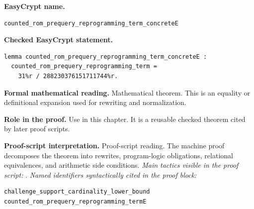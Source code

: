 \begin{formaltheorem}
\noindent\textbf{EasyCrypt name.}
\begin{lstlisting}[language=EasyCrypt,basicstyle=\ttfamily\scriptsize]
counted_rom_prequery_reprogramming_term_concreteE
\end{lstlisting}
\noindent\textbf{Checked EasyCrypt statement.}
\begin{lstlisting}[language=EasyCrypt,basicstyle=\ttfamily\scriptsize]
lemma counted_rom_prequery_reprogramming_term_concreteE :
  counted_rom_prequery_reprogramming_term =
    31%r / 288230376151711744%r.
\end{lstlisting}
\noindent\textbf{Formal mathematical reading.}
Mathematical theorem. This is an equality or definitional expansion used for rewriting and normalization.

\noindent\textbf{Role in the proof.}
Use in this chapter. It is a reusable checked theorem cited by later proof scripts.

\noindent\textbf{Proof-script interpretation.}
Proof-script reading. The machine proof decomposes the theorem into rewrites, program-logic obligations, relational equivalences, and arithmetic side conditions.
\emph{Main tactics visible in the proof script:} .
\emph{Named identifiers syntactically cited in the proof block:}
\begin{lstlisting}[language=EasyCrypt,basicstyle=\ttfamily\scriptsize]
challenge_support_cardinality_lower_bound
counted_rom_prequery_reprogramming_termE
\end{lstlisting}

\end{formaltheorem}

